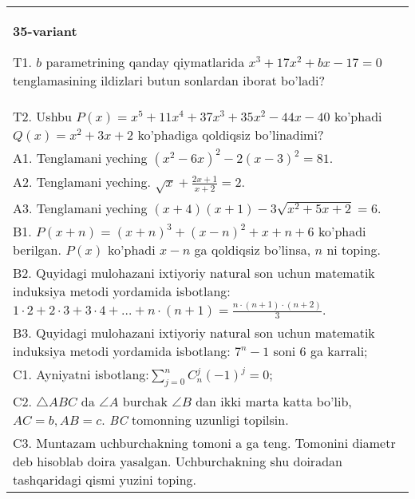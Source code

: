\documentclass{article}
\begin{document}
\begin{tabular}{m{17cm}}
\textbf{35-variant}
\newline

T1. \(b\) parametrining qanday qiymatlarida \(x^{3} + 17x^{2} + bx - 17 = 0\) tenglamasining ildizlari butun sonlardan iborat bo'ladi? \\
T2. Ushbu \(P(x) = x^{5} + 11x^{4} + 37x^{3} + 35x^{2} - 44x - 40\) ko'phadi \(Q(x) = x^{2} + 3x + 2\) ko'phadiga qoldiqsiz bo'linadimi? \\
A1. Tenglamani yeching \(\left( x^{2} - 6x \right)^{2} - 2(x - 3)^{2} = 81\). \\
A2. Tenglamani yeching. \(\sqrt{x} + \frac{2x + 1}{x + 2} = 2\). \\
A3. Tenglamani yeching \((x + 4)(x + 1) - 3\sqrt{x^{2} + 5x + 2} = 6\). \\
B1. \(P(x + n) = (x + n)^{3} + (x - n)^{2} + x + n + 6\) ko'phadi berilgan. \(P(x)\) ko'phadi \(x - n\) ga qoldiqsiz bo'linsa, \(n\) ni toping. \\
B2. Quyidagi mulohazani ixtiyoriy natural son uchun matematik induksiya metodi yordamida isbotlang: \(1 \cdot 2 + 2 \cdot 3 + 3 \cdot 4 + \ldots + n \cdot (n + 1) = \frac{n \cdot (n + 1) \cdot (n + 2)}{3}\). \\
B3. Quyidagi mulohazani ixtiyoriy natural son uchun matematik induksiya metodi yordamida isbotlang: \(7^{n} - 1\) soni 6 ga karrali; \\
C1. Ayniyatni isbotlang:\(\sum_{j = 0}^{n}C_{n}^{j}( - 1)^{j} = 0\); \\
C2. \(\bigtriangleup ABC\) da \(\angle A\) burchak \(\angle B\) dan ikki marta katta bo'lib, \(AC = b,AB = c\). \emph{BC} tomonning uzunligi topilsin. \\
C3. Muntazam uchburchakning tomoni a ga teng. Tomonini diametr deb hisoblab doira yasalgan. Uchburchakning shu doiradan tashqaridagi qismi yuzini toping. \\

\end{tabular}
\vspace{1cm}
\end{document}
